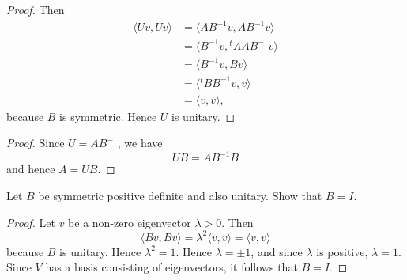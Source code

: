 {{\begin{Solution}
{\begin{proof}
                Then 
                \begin{equation*}
                    \begin{aligned}
                        \langle Uv, Uv \rangle &= \langle AB^{-1}v, AB^{-1}v \rangle \\
                        &= \langle B^{-1}v, {^{t\!}A}AB^{-1}v \rangle \\
                        &= \langle B^{-1}v, Bv \rangle \\
                        &= \langle {^{t\!}B}B^{-1}v, v \rangle \\
                        &= \langle v, v \rangle, 
                    \end{aligned}
                \end{equation*}
                because $B$ is symmetric. 
                Hence $U$ is unitary. 
            \end{proof}
            \item 
            \begin{proof}
                Since $U = AB^{-1}$, we have 
                \begin{equation*}
                    UB = AB^{-1}B 
                \end{equation*}
                and hence $A = UB$. 
            \end{proof}
        }
    \end{Solution}
    \item 
    Let $B$ be symmetric positive definite and also unitary. 
    Show that $B = I$. 
    \begin{Solution}
        \begin{proof}
            Let $v$ be a non-zero eigenvector $\lambda > 0$. 
            Then 
            \begin{equation*}
                \langle Bv, Bv \rangle = \lambda^2 \langle v, v \rangle = \langle v, v \rangle 
            \end{equation*}
            because $B$ is unitary. 
            Hence $\lambda^2 = 1$. 
            Hence $\lambda = \pm 1$, and since $\lambda$ is positive, $\lambda = 1$. 
            Since $V$ has a basis consisting of eigenvectors, it follows that $B = I$. 
        \end{proof}
    \end{Solution}
}
}